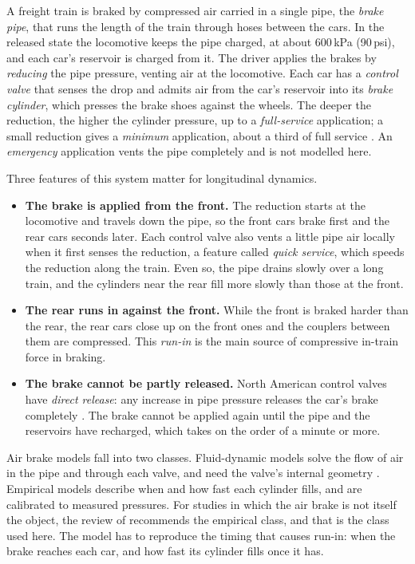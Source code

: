 A freight train is braked by compressed air carried in a single pipe, the \emph{brake pipe}, that runs the length of the train through hoses between the cars. In the released state the locomotive keeps the pipe charged, at about 600\,kPa (90\,psi), and each car's reservoir is charged from it. The driver applies the brakes by \emph{reducing} the pipe pressure, venting air at the locomotive. Each car has a \emph{control valve} that senses the drop and admits air from the car's reservoir into its \emph{brake cylinder}, which presses the brake shoes against the wheels. The deeper the reduction, the higher the cylinder pressure, up to a \emph{full-service} application; a small reduction gives a \emph{minimum} application, about a third of full service \cite{Spiryagin2017HeavyHaul}. An \emph{emergency} application vents the pipe completely and is not modelled here.

Three features of this system matter for longitudinal dynamics.

\begin{itemize}
    \item \textbf{The brake is applied from the front.} The reduction starts at the locomotive and travels down the pipe, so the front cars brake first and the rear cars seconds later. Each control valve also vents a little pipe air locally when it first senses the reduction, a feature called \emph{quick service}, which speeds the reduction along the train. Even so, the pipe drains slowly over a long train, and the cylinders near the rear fill more slowly than those at the front.
    \item \textbf{The rear runs in against the front.} While the front is braked harder than the rear, the rear cars close up on the front ones and the couplers between them are compressed. This \emph{run-in} is the main source of compressive in-train force in braking.
    \item \textbf{The brake cannot be partly released.} North American control valves have \emph{direct release}: any increase in pipe pressure releases the car's brake completely \cite{Spiryagin2017HeavyHaul}. The brake cannot be applied again until the pipe and the reservoirs have recharged, which takes on the order of a minute or more.
\end{itemize}

Air brake models fall into two classes. Fluid-dynamic models solve the flow of air in the pipe and through each valve, and need the valve's internal geometry \cite{Specchia2012AirBrake}. Empirical models describe when and how fast each cylinder fills, and are calibrated to measured pressures. For studies in which the air brake is not itself the object, the review of \cite{Wu2016OverviewLTD} recommends the empirical class, and that is the class used here. The model has to reproduce the timing that causes run-in: when the brake reaches each car, and how fast its cylinder fills once it has.

